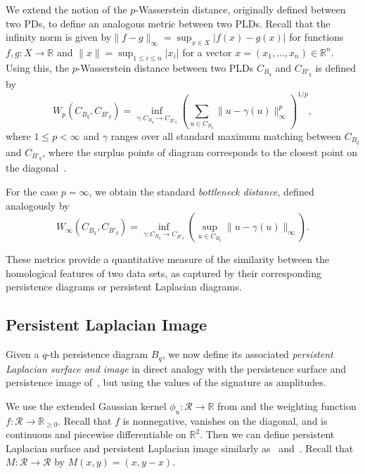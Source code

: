 \documentclass{article}
\newcommand{\R}{\mathbb{R}}
\begin{document}
We extend the notion of the \( p \)-Wasserstein distance, originally defined between two PDs, to define an analogous metric between two PLDs. Recall that the infinity norm is given by\(\| f - g \|_{\infty} = \sup_{x \in X} |f(x) - g(x)|\) for functions \( f, g : X \to \R \) and \(\|x\|=\sup_{1\leq i\leq n}|x_i|\) for a vector $x=(x_1,\ldots,x_n)\in\R^n$. Using this, the \( p \)-Wasserstein distance between two PLDs \( C_{B_q} \) and \( C_{B'_q} \) is defined by
\begin{equation} \label{eq:wasserstein}
W_p(C_{B_q}, C_{B'_q}) = \inf_{\gamma : C_{B_q} \rightarrow C_{B'_q}} \left( \sum_{u \in C_{B_q}} \| u - \gamma(u) \|_{\infty}^p \right)^{1/p},
\end{equation}
where \( 1 \leq p < \infty \) and \( \gamma \) ranges over all standard maximum matching between \( C_{B_q} \) and \( C_{B'_q} \), where the surplus points of diagram corresponds to the closest point on the diagonal~\cite{CEH07}.

For the case \( p = \infty \), we obtain the standard \emph{bottleneck distance}, defined analogously by
\[
W_{\infty}(C_{B_q}, C_{B'_q}) = \inf_{\gamma : C_{B_q} \rightarrow C_{B'_q}} \left( \sup_{u \in C_{B_q}} \| u - \gamma(u) \|_{\infty}\right).
\]

These metrics provide a quantitative measure of the similarity between the homological features of two data sets, as captured by their corresponding persistence diagrams or persistent Laplacian diagrams.

\subsection{Persistent Laplacian Image}

Given a \(q\)-th persistence diagram $B_q$, we now define its associated \emph{persistent Laplacian surface and image} in direct analogy with the persistence surface and persistence image of~\cite{PI17}, but using the values of the signature as amplitudes.

We use the extended Gaussian kernel $\phi_u:\mathcal{R} \to \R$ from  and the weighting function $f:\mathcal{R}\to\R_{\ge 0}$. Recall that $f$ is nonnegative, vanishes on the diagonal, and is continuous and piecewise differentiable on $\R^2$. Then we can define persistent Laplacian surface and persistent Laplacian image similarly as~ and~. Recall that $M : \mathcal R \to \mathcal R$ by $M(x,y) = (x,y-x)$.
\end{document}
